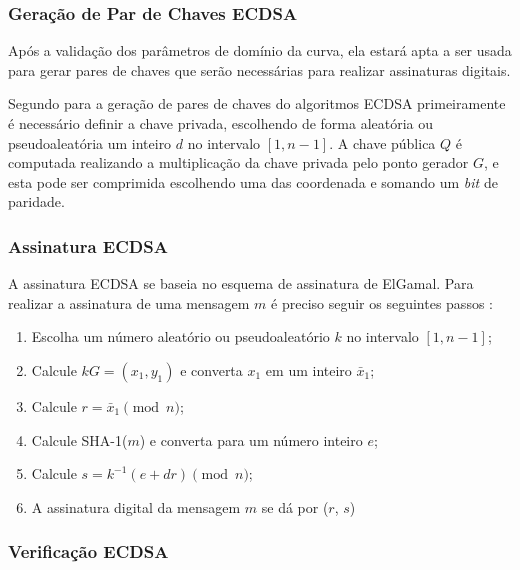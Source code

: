 \subsubsection{Geração de Par de Chaves ECDSA}

Após a validação dos parâmetros de domínio da curva, ela estará apta a ser usada para gerar pares de chaves que serão necessárias para realizar assinaturas digitais.

Segundo  para a geração de pares de chaves do algoritmos ECDSA primeiramente é necessário definir a chave privada, escolhendo de forma aleatória ou pseudoaleatória um inteiro $d$ no intervalo $[1, n - 1]$. A chave pública $Q$ é computada realizando a multiplicação da chave privada pelo ponto gerador $G$, e esta pode ser comprimida escolhendo uma das coordenada e somando um \textit{bit} de paridade.

\subsubsection{Assinatura ECDSA}
 
A assinatura ECDSA se baseia no esquema de assinatura de ElGamal. Para realizar a assinatura de uma mensagem $m$ é preciso seguir os seguintes passos \cite{johnson2001elliptic}:
\begin{enumerate}
    \item Escolha um número aleatório ou pseudoaleatório $k$ no intervalo $[1, n - 1]$;
    \item Calcule $kG = (x_1,y_1)$ e converta $x_1$ em um inteiro $\bar x_1$;
    \item Calcule $r = \bar x_1 \pmod{n}$;
    \item Calcule SHA-1($m$) e converta para um número inteiro $e$;
    \item Calcule $s = k^{-1} (e + dr) \pmod{n}$;
    \item A assinatura digital da mensagem $m$ se dá por ($r$, $s$)
\end{enumerate}

\subsubsection{Verificação ECDSA}

